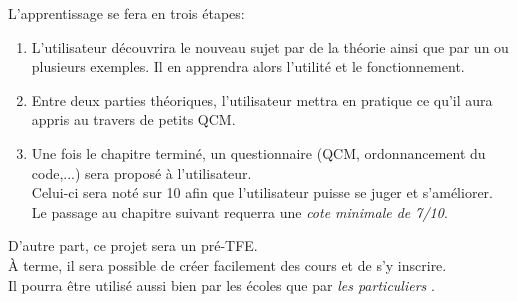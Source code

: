 L’apprentissage se fera en trois étapes:
\begin{enumerate}
    \item L’utilisateur découvrira le nouveau sujet par de la théorie ainsi que par un ou plusieurs exemples. Il en apprendra alors l’utilité et le fonctionnement.
    \item Entre deux parties théoriques, l’utilisateur mettra en pratique ce qu’il aura appris au travers de petits QCM.
    \item Une fois le chapitre terminé, un questionnaire (QCM, ordonnancement du code,...) sera proposé à l’utilisateur.\\
    Celui-ci sera noté sur 10 afin que l’utilisateur puisse se juger et s’améliorer.\\
    Le passage au chapitre suivant requerra une \textit{cote minimale de 7/10}.\\
\end{enumerate}

D'autre part, ce projet sera un pré-TFE.\\
À terme, il sera possible de créer facilement des cours et de s’y inscrire.\\ Il pourra être utilisé aussi bien par les écoles que par  \og \textit{les particuliers} \fg.


